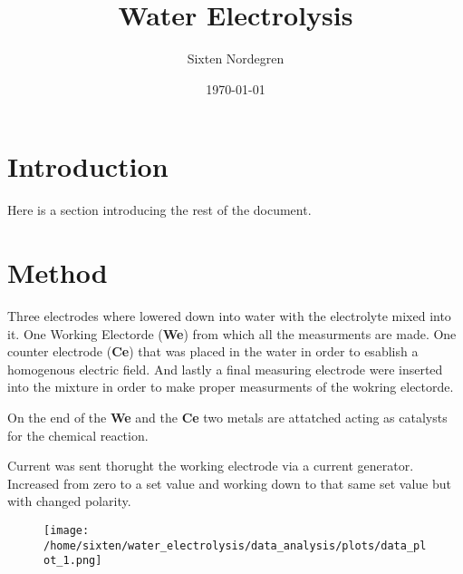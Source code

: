 \documentclass[twocolumn]{revtex4-2}
\begin{document}
\title{Water Electrolysis}
\author{Sixten Nordegren}

\date{\today}

\maketitle
\section{Introduction}
Here is a section introducing the rest of the document.
\section{Method}
Three electrodes where lowered down into water with the electrolyte mixed into it.
One Working Electorde (\textbf{We}) from which all the measurments are made. One counter
electrode (\textbf{Ce}) that was placed in the water in order to esablish a 
homogenous electric field. And lastly a final measuring electrode were inserted
into the mixture in order to make proper measurments of the wokring electorde.

On the end of the \textbf{We} and the \textbf{Ce} two metals are attatched acting 
as catalysts for the chemical reaction. 

Current was sent thorught the working electrode via a current generator. Increased
from zero to a set value and working down to that same set value but with changed 
polarity.

\begin{figure}
	\texttt{[image: /home/sixten/water\_electrolysis/data\_analysis/plots/data\_plot\_1.png]}
\end{figure}
\end{document}
